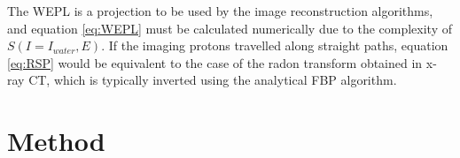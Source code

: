 \documentclass[11pt,a4paper]{article}
\begin{document}
The WEPL is a projection to be used by the image reconstruction algorithms, and equation \ref{eq:WEPL} must be calculated numerically due to the complexity of $S(I = I_{water}, E)$. If the imaging protons travelled along straight paths, equation \ref{eq:RSP} would be equivalent to the case of the radon transform obtained in x-ray CT, which is typically inverted using the analytical FBP algorithm. 


\section{Method}
\end{document}
